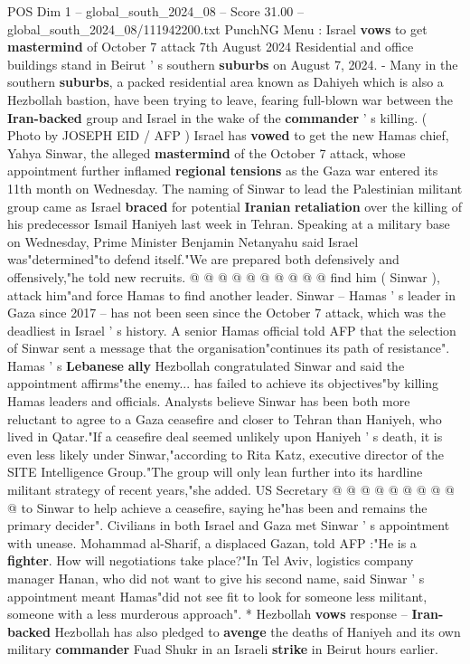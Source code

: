 \begin{textsample}{POS Dim 1 – global\_south\_2024\_08 – Score 31.00 – global\_south\_2024\_08/111942200.txt}  \label{ex:f1_pos_007}
PunchNG Menu : Israel \textbf{vows} to get \textbf{mastermind} of October 7 attack 7th August 2024 Residential and office buildings stand in Beirut ' s southern \textbf{suburbs} on August 7, 2024. - Many in the southern \textbf{suburbs}, a packed residential area known as Dahiyeh which is also a Hezbollah bastion, have been trying to leave, fearing full-blown war between the \textbf{Iran-backed} group and Israel in the wake of the \textbf{commander} ' s killing. ( Photo by JOSEPH EID / AFP ) Israel has \textbf{vowed} to get the new Hamas chief, Yahya Sinwar, the alleged \textbf{mastermind} of the October 7 attack, whose appointment further inflamed \textbf{regional} \textbf{tensions} as the Gaza war entered its 11th month on Wednesday.
The naming of Sinwar to lead the Palestinian militant group came as Israel \textbf{braced} for potential \textbf{Iranian} \textbf{retaliation} over the killing of his predecessor Ismail Haniyeh last week in Tehran.
Speaking at a military base on Wednesday, Prime Minister Benjamin Netanyahu said Israel was"determined"to defend itself."We are prepared both defensively and offensively,"he told new recruits. @ @ @ @ @ @ @ @ @ @ find him ( Sinwar ), attack him"and force Hamas to find another leader.
Sinwar -- Hamas ' s leader in Gaza since 2017 -- has not been seen since the October 7 attack, which was the deadliest in Israel ' s history.
A senior Hamas official told AFP that the selection of Sinwar sent a message that the organisation"continues its path of resistance".
Hamas ' s \textbf{Lebanese} \textbf{ally} Hezbollah congratulated Sinwar and said the appointment affirms"the enemy... has failed to achieve its objectives"by killing Hamas leaders and officials.
Analysts believe Sinwar has been both more reluctant to agree to a Gaza ceasefire and closer to Tehran than Haniyeh, who lived in Qatar."If a ceasefire deal seemed unlikely upon Haniyeh ' s death, it is even less likely under Sinwar,"according to Rita Katz, executive director of the SITE Intelligence Group."The group will only lean further into its hardline militant strategy of recent years,"she added.
US Secretary @ @ @ @ @ @ @ @ @ @ to Sinwar to help achieve a ceasefire, saying he"has been and remains the primary decider".
Civilians in both Israel and Gaza met Sinwar ' s appointment with unease.
Mohammad al-Sharif, a displaced Gazan, told AFP :"He is a \textbf{fighter}.
How will negotiations take place?"In Tel Aviv, logistics company manager Hanan, who did not want to give his second name, said Sinwar ' s appointment meant Hamas"did not see fit to look for someone less militant, someone with a less murderous approach". * Hezbollah \textbf{vows} response -- \textbf{Iran-backed} Hezbollah has also pledged to \textbf{avenge} the deaths of Haniyeh and its own military \textbf{commander} Fuad Shukr in an Israeli \textbf{strike} in Beirut hours earlier.

\end{textsample}
